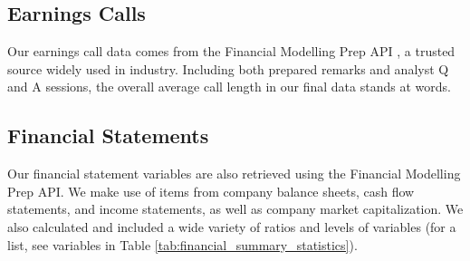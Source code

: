 \documentclass{article}[11pt]
\begin{document}
    \subsection*{Earnings Calls}

    Our earnings call data comes from the Financial Modelling Prep API \citep{financial_modeling_prep_financial_2024}, a trusted source widely used in industry. Including both prepared remarks and analyst Q and A sessions, the overall average call length in our final data stands at \avgCallLength \space words.

    \subsection*{Financial Statements}

    Our financial statement variables are also retrieved using the Financial Modelling Prep API. We make use of items from company balance sheets, cash flow statements, and income statements, as well as company market capitalization. We also calculated and included a wide variety of ratios and levels of variables (for a list, see variables in Table \ref{tab:financial_summary_statistics}).
\end{document}
